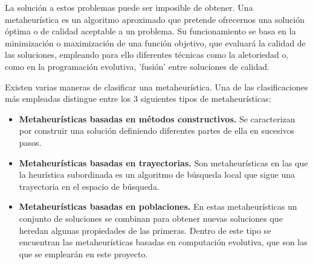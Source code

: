 La solución a estos problemas puede ser imposible de obtener. Una metaheurística es un algoritmo aproximado que pretende ofrecernos una solución óptima o de calidad aceptable a un problema. Su funcionamiento se basa en la minimización o maximización de una función objetivo, que evaluará la calidad de las soluciones, empleando para ello diferentes técnicas como la aletoriedad o, como en la programación evolutiva, 'fusión' entre soluciones de calidad.

Existen varias maneras de clasificar una metaheurística. Una de las clasificaciones más empleadas distingue entre los 3 siguientes tipos de metaheurísticas:
\begin{itemize}
	\item \textbf{Metaheurísticas basadas en métodos constructivos. }Se caracterizan por construir una solución definiendo diferentes partes de ella en sucesivos pasos.
	\item \textbf{Metaheurísticas basadas en trayectorias. }Son metaheurísticas en las que la heurística subordinada es un algoritmo de búsqueda local que sigue una trayectoria en el espacio de búsqueda.
	\item \textbf{Metaheurísticas basadas en poblaciones. }En estas metaheurísticas un conjunto de soluciones se combinan para obtener nuevas soluciones que heredan algunas propiedades de las primeras. Dentro de este tipo se encuentran las metaheurísticas basadas en computación evolutiva, que son las que se emplearán en este proyecto.
\end{itemize}
